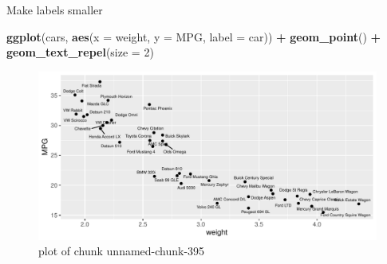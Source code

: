 \documentclass[ignorenonframetext,]{beamer}
\newenvironment{Shaded}{\begin{snugshade}}{\end{snugshade}}
\newcommand{\DataTypeTok}[1]{\textcolor[rgb]{0.13,0.29,0.53}{#1}}
\newcommand{\DecValTok}[1]{\textcolor[rgb]{0.00,0.00,0.81}{#1}}
\newcommand{\KeywordTok}[1]{\textcolor[rgb]{0.13,0.29,0.53}{\textbf{#1}}}
\newcommand{\NormalTok}[1]{#1}
\newcommand{\OperatorTok}[1]{\textcolor[rgb]{0.81,0.36,0.00}{\textbf{#1}}}
\newcommand{\StringTok}[1]{\textcolor[rgb]{0.31,0.60,0.02}{#1}}
\begin{document}
\begin{frame}[fragile]{Make labels smaller}
\protect\hypertarget{make-labels-smaller}{}

\begin{Shaded}
\begin{Highlighting}[]
\KeywordTok{ggplot}\NormalTok{(cars, }\KeywordTok{aes}\NormalTok{(}\DataTypeTok{x =}\NormalTok{ weight, }\DataTypeTok{y =}\NormalTok{ MPG, }\DataTypeTok{label =}\NormalTok{ car)) }\OperatorTok{+}
\StringTok{  }\KeywordTok{geom_point}\NormalTok{() }\OperatorTok{+}\StringTok{ }\KeywordTok{geom_text_repel}\NormalTok{(}\DataTypeTok{size =} \DecValTok{2}\NormalTok{)}
\end{Highlighting}
\end{Shaded}

\begin{figure}
\centering
\includegraphics{figure/unnamed-chunk-395-1.pdf}
\caption{plot of chunk unnamed-chunk-395}
\end{figure}

\end{frame}
\end{document}
